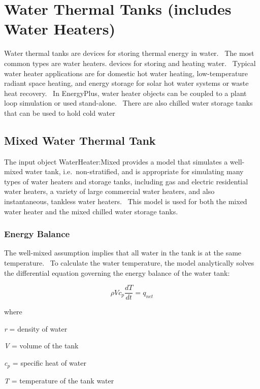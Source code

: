 \section{Water Thermal Tanks (includes Water Heaters) }\label{water-thermal-tanks-includes-water-heaters}

Water thermal tanks are devices for storing thermal energy in water.~ The most common types are water heaters. devices for storing and heating water.~ Typical water heater applications are for domestic hot water heating, low-temperature radiant space heating, and energy storage for solar hot water systems or waste heat recovery.~ In EnergyPlus, water heater objects can be coupled to a plant loop simulation or used stand-alone.~ There are also chilled water storage tanks that can be used to hold cold water

\subsection{Mixed Water Thermal Tank}\label{mixed-water-thermal-tank}

The input object WaterHeater:Mixed provides a model that simulates a well-mixed water tank, i.e.~non-stratified, and is appropriate for simulating many types of water heaters and storage tanks, including gas and electric residential water heaters, a variety of large commercial water heaters, and also instantaneous, tankless water heaters.~ This model is used for both the mixed water heater and the mixed chilled water storage tanks.

\subsubsection{Energy Balance}\label{energy-balance}

The well-mixed assumption implies that all water in the tank is at the same temperature.~ To calculate the water temperature, the model analytically solves the differential equation governing the energy balance of the water tank:

\begin{equation}
\rho V{c_p}\frac{{dT}}{{dt}} = {q_{net}}
\end{equation}

where

\emph{r} = density of water

\emph{V} = volume of the tank

\emph{c\(_{p}\)} = specific heat of water

\emph{T} = temperature of the tank water

